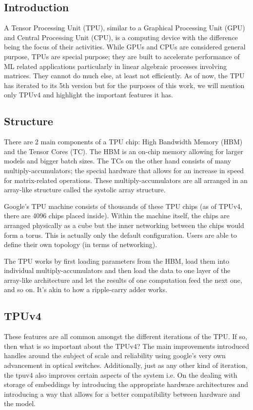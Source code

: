 \documentclass[conference]{IEEEtran}
\begin{document}
    \subsection{Introduction}
    A Tensor Processing Unit (TPU), similar to a Graphical Processing Unit (GPU) and Central Processing Unit (CPU), is a computing device with the difference being the focus of their activities.
    While GPUs and CPUs are considered general purpose, TPUs are special purpose; they are built to accelerate performance of ML related applications particularly in linear algebraic processes involving matrices.
    They cannot do much else, at least not efficiently.
    As of now, the TPU has iterated to its 5th version but for the purposes of this work, we will mention only TPUv4 and highlight the important features it has.

    \subsection{Structure}
    There are 2 main components of a TPU chip: High Bandwidth Memory (HBM) and the Tensor Cores (TC).
    The HBM is an on-chip memory allowing for larger models and bigger batch sizes.
    The TCs on the other hand consists of many multiply-accumulators; the special hardware that allows for an increase in speed for matrix-related operations.
    These multiply-accumulators are all arranged in an array-like structure called the systolic array structure.

    Google’s TPU machine consists of thousands of these TPU chips (as of TPUv4, there are 4096 chips placed inside).
    Within the machine itself, the chips are arranged physically as a cube but the inner networking between the chips would form a torus.
    This is actually only the default configuration.
    Users are able to define their own topology (in terms of networking).

    The TPU works by first loading parameters from the HBM, load them into individual multiply-accumulators and then load the data to one layer of the array-like architecture and let the results of one computation feed the next one, and so on.
    It’s akin to how a ripple-carry adder works.

    \subsection{TPUv4}
    These features are all common amongst the different iterations of the TPU\@.
    If so, then what is so important about the TPUv4?
    The main improvements introduced handles around the subject of scale and reliability using google's very own advancement in optical switches.
    Additionally, just as any other kind of iteration, the tpuv4 also improves certain aspects of the system i.e.
    On the dealing with storage of embeddings by introducing the appropriate hardware architectures and introducing a way that allows for a better compatibility between hardware and the model.
\end{document}
